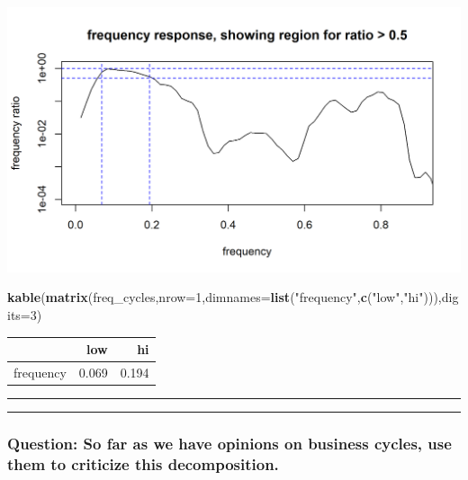 \documentclass[]{article}
\newenvironment{Shaded}{\begin{snugshade}}{\end{snugshade}}
\newcommand{\KeywordTok}[1]{\textcolor[rgb]{0.13,0.29,0.53}{\textbf{#1}}}
\newcommand{\DataTypeTok}[1]{\textcolor[rgb]{0.13,0.29,0.53}{#1}}
\newcommand{\DecValTok}[1]{\textcolor[rgb]{0.00,0.00,0.81}{#1}}
\newcommand{\StringTok}[1]{\textcolor[rgb]{0.31,0.60,0.02}{#1}}
\newcommand{\NormalTok}[1]{#1}
\begin{document}
\begin{center}\includegraphics{figure/intro-show_range-1} \end{center}

\begin{Shaded}
\begin{Highlighting}[]
\KeywordTok{kable}\NormalTok{(}\KeywordTok{matrix}\NormalTok{(freq_cycles,}\DataTypeTok{nrow=}\DecValTok{1}\NormalTok{,}\DataTypeTok{dimnames=}\KeywordTok{list}\NormalTok{(}\StringTok{"frequency"}\NormalTok{,}\KeywordTok{c}\NormalTok{(}\StringTok{"low"}\NormalTok{,}\StringTok{"hi"}\NormalTok{))),}\DataTypeTok{digits=}\DecValTok{3}\NormalTok{)}
\end{Highlighting}
\end{Shaded}

\begin{longtable}[]{@{}lrr@{}}
\toprule
& low & hi\tabularnewline
\midrule
\endhead
frequency & 0.069 & 0.194\tabularnewline
\bottomrule
\end{longtable}

\begin{center}\rule{0.5\linewidth}{\linethickness}\end{center}

\begin{center}\rule{0.5\linewidth}{\linethickness}\end{center}

\subsubsection{Question: So far as we have opinions on business cycles,
use them to criticize this
decomposition.}\label{question-so-far-as-we-have-opinions-on-business-cycles-use-them-to-criticize-this-decomposition.}
\end{document}
